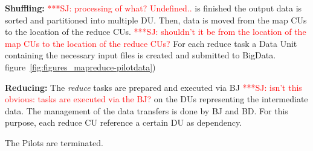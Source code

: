 \documentclass{acm_proc_article-sp}
\newcommand{\jhanote}[1]{ {\textcolor{red} { ***SJ: #1 }}}
\newcommand{\alnote}[1]{ {\textcolor{blue} { ***andreL: #1 }}}
\newcommand{\pnote}[1]{ {\textcolor{magenta} { ***pradeep: #1 }}}
\newcommand{\alnote}[1]{}
\newcommand{\pnote}[1]{}
\newcommand{\jhanote}[1]{}
\newcommand{\pilots}{Pilots\xspace}
\begin{document}
\begin{compactenum}[A.]
\item \textbf{Shuffling:} %
  \jhanote{processing of what? Undefined..}is finished the output data
  is sorted and partitioned into multiple DU. Then, data is moved from
  the map CUs to the location of the reduce CUs. \jhanote{shouldn't it
    be from the location of the map CUs to the location of the reduce
    CUs?} For each reduce task a Data Unit containing the necessary
  input files is created and submitted to BigData. %
  figure~\ref{fig:figures_mapreduce-pilotdata})
		
	
\item \textbf{Reducing:} The {\it reduce} tasks are prepared and
  executed via BJ \jhanote{isn't this obvious: tasks are executed via
    the BJ?} on the DUs representing the intermediate data.
  The management of the data transfers is done by BJ and BD. For this
  purpose, each reduce CU reference a certain DU as dependency.
	
	\item The \pilots are terminated.

\end{compactenum}

\end{document}
